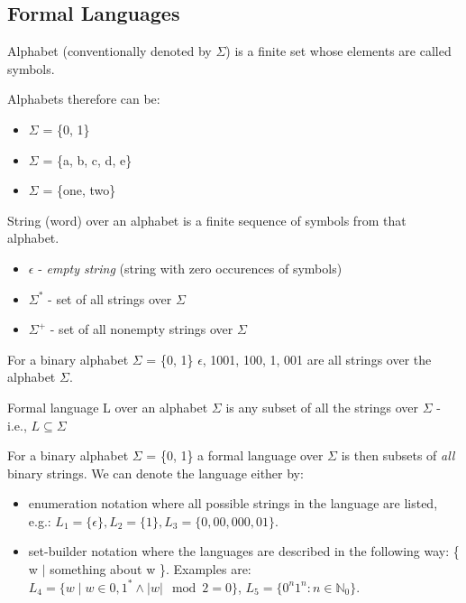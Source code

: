 \subsection{Formal Languages}

\begin{definition}
Alphabet (conventionally denoted by $\Sigma$) is a finite set whose elements are called symbols.
\end{definition}
Alphabets therefore can be:
\begin{itemize}
    \item $\Sigma$ = \{0, 1\}
    \item $\Sigma$ = \{a, b, c, d, e\}
    \item $\Sigma$ = \{one, two\}
\end{itemize}

\begin{definition}
String (word) over an alphabet is a finite sequence of symbols from that alphabet.
\end{definition}
\begin{itemize}
    \item $\epsilon$ - \textit{empty string} (string with zero occurences of symbols)
    \item $\Sigma^{*}$ - set of all strings over $\Sigma$
    \item $\Sigma^{+}$ - set of all nonempty strings over $\Sigma$
\end{itemize}
For a binary alphabet $\Sigma$ = \{0, 1\} $\epsilon$, 1001, 100, 1, 001 are all strings over the alphabet $\Sigma$.

\begin{definition}
Formal language L over an alphabet $\Sigma$ is any subset of all the strings over $\Sigma$ - i.e., $L \subseteq \Sigma$
\end{definition}
For a binary alphabet $\Sigma$ = \{0, 1\} a formal language over $\Sigma$ is then subsets of \textit{all} binary strings. We can denote the language either by:
\begin{itemize}
    \item enumeration notation where all possible strings in the language are listed, e.g.: $\textit{L}_1 = \{\epsilon\}, \textit{L}_2 = \{1\}, \textit{L}_3 = \{0, 00, 000, 01\}$.
    \item set-builder notation where the languages are described in the following way: \{ w $\mid$ something about w \}. Examples are: $\textit{L}_4 = \{\textit{w} \mid \textit{w} \in {0,1}^* \wedge \left\lvert \textit{w} \right\rvert \mod 2 = 0\}$, $\textit{L}_5 = \{0^\textit{n}1^\textit{n} : \textit{n} \in \mathbb{N}_0\}$.
\end{itemize}

